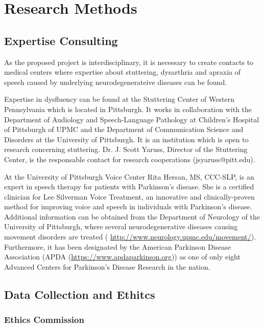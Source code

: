 \chapter{Research Methods}
\label{cha:methods}
\acresetall



\section{Expertise Consulting}

As the proposed project is interdisciplinary, it is necessary to create contacts to medical centers where expertise about stuttering, dysarthria and apraxia of speech caused by underlying neurodegenerateive diseases can be found.

Expertise in dysfluency can be found at the Stuttering Center of Western Pennsylvania which is located in Pittsburgh. It works in collaboration with the Department of Audiology and Speech-Language Pathology at Children's Hospital of Pittsburgh of UPMC and the Department of Communication Science and Disorders at the University of Pittsburgh. It is an institution which is open to research concerning stuttering. Dr. J. Scott Yaruss, Director of the Stuttering Center, is the responsable contact for research cooperations (jsyaruss@pitt.edu).

At the University of Pittsburgh Voice Center Rita Hersan, MS, CCC-SLP, is an expert in speech therapy for patients with Parkinson's disease. She is a certified clinician for Lee Silverman Voice Treatment, an innovative and clinically-proven method for improving voice and speech in individuals with Parkinson's disease. Additional information can be obtained from the Department of Neurology of the University of Pittsburgh, where several neurodegenerative diseases causing movement disorders are treated (
\url{http://www.neurology.upmc.edu/movement/}). Furthermore, it has been designated by the American Parkinson Disease Association (APDA (\url{https://www.apdaparkinson.org})) as one of only eight Advanced Centers for Parkinson’s Disease Research in the nation.

\section{Data Collection and Ethitcs}
\subsection{Ethics Commission}

